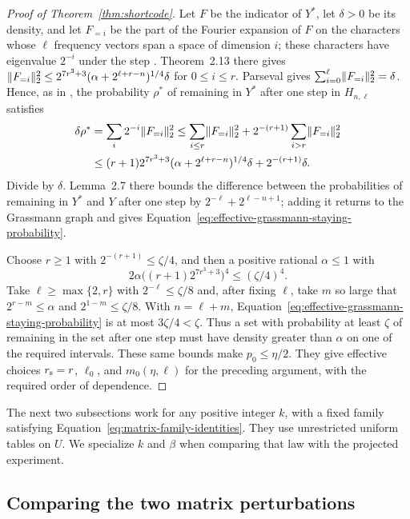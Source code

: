 \begin{proof}[Proof of Theorem~\ref{thm:shortcode}]
Let $F$ be the indicator of $Y^*$, let
$\delta>0$ be its density, and let $F_{=i}$ be the part of the Fourier
expansion of $F$ on the characters whose $\ell$ frequency vectors span a
space of dimension $i$; these characters have eigenvalue $2^{-i}$ under
the step \cite[Lemma~2.10]{KMS23}.  Theorem~2.13 there gives
$\lVert F_{=i}\rVert_2^2\le2^{7r^3+3}(\alpha+2^{\ell+r-n})^{1/4}\delta$ for
$0\le i\le r$.  Parseval gives
$\sum_{i=0}^\ell\lVert F_{=i}\rVert_2^2=\delta$.  Hence, as in
\cite[Section~2.4]{KMS23}, the probability $\rho^*$ of remaining in $Y^*$ after one step in $H_{n,\ell}$
satisfies
\begin{align*}
 \delta\rho^*
 &=\sum_i2^{-i}\lVert F_{=i}\rVert_2^2
 \le\sum_{i\le r}\lVert F_{=i}\rVert_2^2
   +2^{-(r+1)}\sum_{i>r}\lVert F_{=i}\rVert_2^2\\
 &\le(r+1)2^{7r^3+3}(\alpha+2^{\ell+r-n})^{1/4}\delta
   +2^{-(r+1)}\delta.
\end{align*}
Divide by $\delta$.  Lemma~2.7 there bounds the difference between the
probabilities of remaining in $Y^*$ and $Y$ after one step by $2^{-\ell}+2^{\ell-n+1}$; adding it returns
to the Grassmann graph and gives
Equation~\eqref{eq:effective-grassmann-staying-probability}.

Choose $r\ge1$ with $2^{-(r+1)}\le\zeta/4$, and then a positive
rational $\alpha\le1$ with
\[
 2\alpha\bigl((r+1)2^{7r^3+3}\bigr)^4\le(\zeta/4)^4.
\]
Take $\ell\ge\max\{2,r\}$ with $2^{-\ell}\le\zeta/8$ and, after
fixing $\ell$, take $m$ so large that
$2^{r-m}\le\alpha$ and $2^{1-m}\le\zeta/8$.
With $n=\ell+m$, Equation~\eqref{eq:effective-grassmann-staying-probability}
is at most $3\zeta/4<\zeta$.  Thus a set with probability at least
$\zeta$ of remaining in the set after one step must have density greater than $\alpha$ on one of the
required intervals.  These same bounds make $p_0\le\eta/2$.
They give effective choices $r_{\rm s}=r$, $\ell_0$, and
$m_0(\eta,\ell)$ for the preceding argument, with the required
order of dependence.
\end{proof}

The next two subsections work for any positive integer $k$, with a fixed
family satisfying Equation~\eqref{eq:matrix-family-identities}.  They use
unrestricted uniform tables on $U$.
We specialize $k$ and $\beta$ when comparing that law with the projected
experiment.

\subsection{Comparing the two matrix perturbations}

